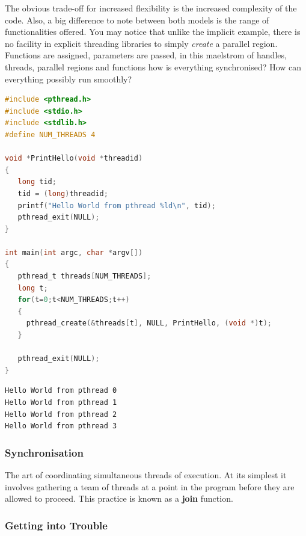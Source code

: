 \documentclass[11pt]{article} %
\begin{document}
The obvious trade-off for increased flexibility is the increased complexity of the code. Also, a big difference to note between both models is the range of functionalities offered. You may notice that unlike the implicit example, there is no facility in explicit threading libraries to simply {\it create} a parallel region. Functions are assigned, parameters are passed, in this maelstrom of handles, threads, parallel regions and functions how is everything synchronised? How can everything possibly run smoothly? 
\begin{lstlisting}[language=C, caption={Hello World from PThreads}]
#include <pthread.h>
#include <stdio.h>
#include <stdlib.h>
#define NUM_THREADS	4

void *PrintHello(void *threadid)
{
   long tid;
   tid = (long)threadid;
   printf("Hello World from pthread %ld\n", tid);
   pthread_exit(NULL);
}

int main(int argc, char *argv[])
{
   pthread_t threads[NUM_THREADS];
   long t;
   for(t=0;t<NUM_THREADS;t++)
   {
     pthread_create(&threads[t], NULL, PrintHello, (void *)t);
   }
   
   pthread_exit(NULL);
}
\end{lstlisting}
\begin{verbatim}
Hello World from pthread 0
Hello World from pthread 1
Hello World from pthread 2
Hello World from pthread 3
\end{verbatim}
\subsubsection{Synchronisation}
The art of coordinating simultaneous threads of execution. At its simplest it involves gathering a team of threads at a point in the program before they are allowed to proceed. This practice is known as a {\bf join} function. 
\subsubsection{Getting into Trouble}
\end{document}
